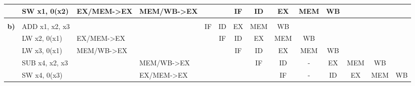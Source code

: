 \documentclass{article}
\begin{document}
\begin{table}[h]
{\begin{tabular}{|l|l|l|l|l|l|c|c|c|c|c|c|l|l|}
    \textbf{}                                & SW  x1, 0(x2)         & EX/MEM-\textgreater{}EX & MEM/WB-\textgreater{}EX  &                         &                         & IF                    & ID                    & EX                    & MEM                   & WB                    &                       & \multicolumn{1}{c|}{}    & \multicolumn{1}{c|}{}   \\ \hline
                                             &                       &                         &                          &                         &                         & \multicolumn{1}{l|}{} & \multicolumn{1}{l|}{} & \multicolumn{1}{l|}{} & \multicolumn{1}{l|}{} & \multicolumn{1}{l|}{} & \multicolumn{1}{l|}{} &                          &                         \\ \hline
    \textbf{b)}                              & ADD x1, x2, x3        &                         &                          & \multicolumn{1}{c|}{IF} & \multicolumn{1}{c|}{ID} & EX                    & MEM                   & WB                    & \multicolumn{1}{l|}{} & \multicolumn{1}{l|}{} & \multicolumn{1}{l|}{} &                          &                         \\ \hline
                                             & LW  x2, 0(x1)         & EX/MEM-\textgreater{}EX &                          &                         & \multicolumn{1}{c|}{IF} & ID                    & EX                    & MEM                   & WB                    &                       &                       &                          &                         \\ \hline
    \textbf{}                                & LW  x3, 0(x1)         & MEM/WB-\textgreater{}EX &                          &                         &                         & IF                    & ID                    & EX                    & MEM                   & WB                    &                       & \multicolumn{1}{c|}{}    &                         \\ \hline
                                             & SUB x4, x2, x3        &                         & MEM/WB-\textgreater{}EX  &                         &                         & \multicolumn{1}{l|}{} & IF                    & ID                    & -                     & EX                    & MEM                   & \multicolumn{1}{c|}{WB}  & \multicolumn{1}{c|}{}   \\ \hline
                                             & SW  x4, 0(x3)         &                         & EX/MEM-\textgreater{}EX  &                         &                         & \multicolumn{1}{l|}{} & \multicolumn{1}{l|}{} & IF                    & -                     & ID                    & EX                    & \multicolumn{1}{c|}{MEM} & \multicolumn{1}{c|}{WB} \\ \hline

\end{tabular}}
\end{table}
\end{document}
